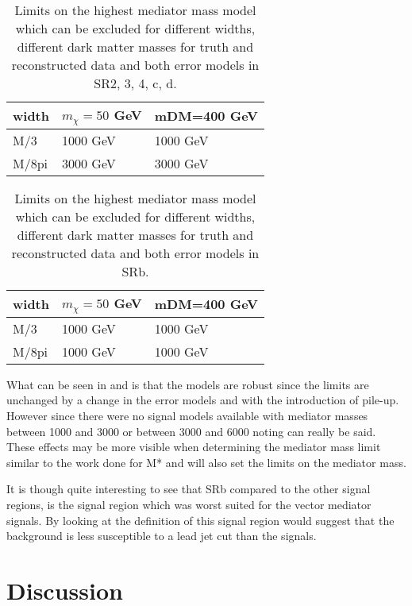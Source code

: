 \begin{table}[ht]
\begin{center}
\begin{tabular}{|l|l|l|}
\hline
width & $m_{\chi}=50$ GeV & mDM=400 GeV \\ \hline
M/3 & 1000 GeV & 1000 GeV \\ \hline
M/8pi & 3000 GeV & 3000 GeV\\ \hline
\end{tabular}
\caption{Limits on the highest mediator mass model which can be excluded for different widths, different dark matter masses for truth and reconstructed data and both error models in SR2, 3, 4, c, d.}
\label{tab:mediatorpass}
\end{center}
\end{table}
\begin{table}[ht]
\begin{center}
\begin{tabular}{|l|l|l|}
\hline
width & $m_{\chi}=50$ GeV & mDM=400 GeV \\ \hline
M/3 & 1000 GeV & 1000 GeV\\ \hline
M/8pi & 1000 GeV & 1000 GeV\\ \hline
\end{tabular}
\caption{Limits on the highest mediator mass model which can be excluded for different widths, different dark matter masses for truth and reconstructed data and both error models in SRb.}
\label{tab:mediatorpass2}
\end{center}
\end{table}

What can be seen in  and  is that the models are robust since the limits are unchanged by a change in the error models and with the introduction of pile-up. However since there were no signal models available with mediator masses between 1000 and 3000 or between 3000 and 6000 noting can really be said. These effects may be more visible when determining the mediator mass limit similar to the work done for M* and will also set the limits on the mediator mass. 

It is though quite interesting to see that SRb compared to the other signal regions, is the signal region which was worst suited for the vector mediator signals. By looking at the definition of this signal region would suggest that the background is less susceptible to a lead jet cut than the signals.

\newpage
\section{Discussion}
